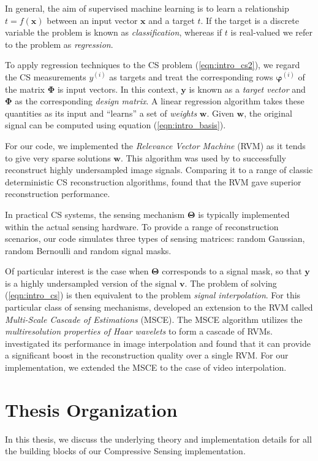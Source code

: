 In general, the aim of supervised machine learning is to learn a relationship $t = f(\bm x)$ between an input vector $\bm x$ and a target $t$.
If the target is a discrete variable the problem is known as \emph{classification}, whereas if $t$ is real-valued we refer to the problem as \emph{regression}.

To apply regression techniques to the CS problem (\ref{eqn:intro_cs2}), we regard the CS measurements $y^{(i)}$ as targets and treat the corresponding rows $\bm\varphi^{(i)}$ of the matrix $\bm\Phi$ is input vectors.
In this context, $\bm y$ is known as a \emph{target vector} and $\bm\Phi$ as the corresponding \emph{design matrix}.
A linear regression algorithm takes these quantities as its input and ``learns'' a set of \emph{weights} $\bm w$.
Given $\bm w$, the original signal can be computed using equation (\ref{eqn:intro_basis}).

For our code, we implemented the \emph{Relevance Vector Machine} (RVM) \cite{tipping2001,tipping2003} as it tends to give very sparse solutions $\bm w$.
This algorithm was used by \cite{pilikos2014} to successfully reconstruct highly undersampled image signals.
Comparing it to a range of classic deterministic CS reconstruction algorithms, \cite{pilikos2014} found that the RVM gave superior reconstruction performance.

In practical CS systems, the sensing mechanism $\bm\Theta$ is typically implemented within the actual sensing hardware.
To provide a range of reconstruction scenarios, our code simulates three types of sensing matrices: random Gaussian, random Bernoulli and random signal masks.

Of particular interest is the case when $\bm\Theta$ corresponds to a signal mask, so that $\bm y$ is a highly undersampled version of the signal $\bm v$.
The problem of solving (\ref{eqn:intro_cs}) is then equivalent to the problem \emph{signal interpolation}.
For this particular class of sensing mechanisms, \cite{pilikos2014} developed an extension to the RVM called \emph{Multi-Scale Cascade of Estimations} (MSCE).
The MSCE algorithm utilizes the \emph{multiresolution properties of Haar wavelets} to form a cascade of RVMs.
\cite{pilikos2014} investigated its performance in image interpolation and found that it can provide a significant boost in the reconstruction quality over a single RVM.
For our implementation, we extended the MSCE to the case of video interpolation.



\section*{Thesis Organization}
In this thesis, we discuss the underlying theory and implementation details for all the building blocks of our Compressive Sensing implementation.

